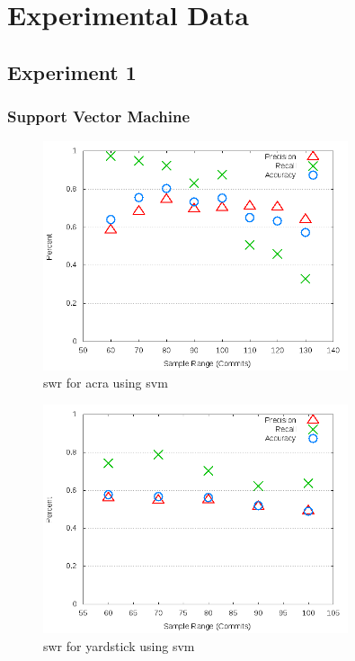 \appendix
\chapter{Experimental Data}
\label{app:experimental_data}

\section{Experiment 1}
\label{app_sec:experiment_1}

\subsection{Support Vector Machine}
\label{app_sub:experiment_1_svm}

\begin{figure}
\centering
\includegraphics[width=0.8\textwidth]{images/svm/test_1/acra_sample_range.png}
\caption{\gls{swr} for acra using \gls{svm}}
\label{fig:test_1_acra_svm}
\end{figure}


\begin{figure}
\centering
\includegraphics[width=0.8\textwidth]{images/svm/test_1/yardstick_sample_range.png}
\caption{\gls{swr} for yardstick using \gls{svm}}
\label{fig:test_1_yardstick_svm}
\end{figure}

